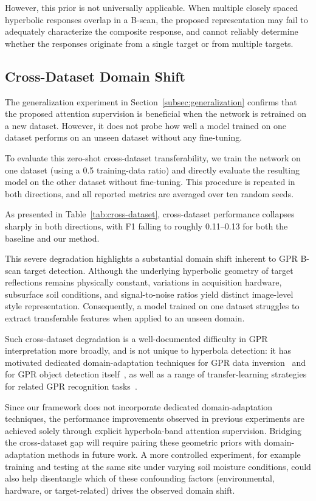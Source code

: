 \documentclass[lettersize,journal]{IEEEtran}
\begin{document}
However, this prior is not universally applicable. When multiple closely spaced hyperbolic responses overlap in a B-scan, the proposed representation may fail to adequately characterize the composite response, and cannot reliably determine whether the responses originate from a single target or from multiple targets.


\subsection{Cross-Dataset Domain Shift}
\label{sec:cross-dataset}
The generalization experiment in Section~\ref{subsec:generalization} confirms that the proposed attention supervision is beneficial when the network is retrained on a new dataset. However,  it does not probe how well a model trained on one dataset performs on an unseen dataset without any fine-tuning. 

To evaluate this zero-shot cross-dataset transferability, we train the network on one dataset (using a 0.5 training-data ratio) and directly evaluate the resulting model on the other dataset without fine-tuning. This procedure is repeated in both directions, and all reported metrics are averaged over ten random seeds. 

As presented in Table~\ref{tab:cross-dataset}, cross-dataset performance collapses sharply in both directions, with F1 falling to roughly 0.11--0.13 for both the baseline and our method. 

This severe degradation highlights a substantial domain shift inherent to GPR B-scan target detection. Although the underlying hyperbolic geometry of target reflections remains physically constant, variations in acquisition hardware, subsurface soil conditions, and signal-to-noise ratios yield distinct image-level style representation. Consequently, a model trained on one dataset struggles to extract transferable features when applied to an unseen domain. 


Such cross-dataset degradation is a well-documented difficulty in GPR interpretation more broadly,
and is not unique to hyperbola detection: it has motivated dedicated domain-adaptation techniques for GPR data inversion~\cite{rw-gpr-uda} and for GPR object detection itself~\cite{rw-gpr-da}, as well as a range of transfer-learning strategies for related GPR recognition tasks~\cite{intro-tl-gpr1,intro-tl-gpr2,intro-tl-gpr3}.

Since our framework does not incorporate dedicated domain-adaptation techniques, the performance improvements observed in previous experiments are achieved solely through explicit hyperbola-band attention supervision. Bridging the cross-dataset gap will require pairing these geometric priors with domain-adaptation methods in future work. 
A more controlled experiment, for example training and testing at the same site under varying soil moisture conditions, could also help disentangle which of these confounding factors (environmental, hardware, or target-related) drives the observed domain shift. 
\end{document}
